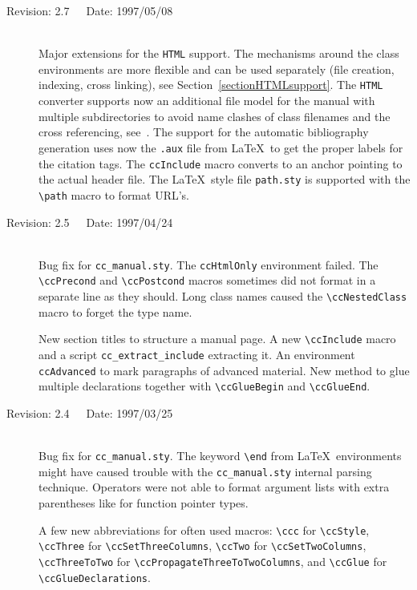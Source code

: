 \documentclass[11pt]{article}
\begin{document}
\begin{description}
    \item[Revision: 2.7~~~Date: 1997/05/08]~\\[3mm]
    Major extensions for the {\tt HTML} support. The mechanisms around the
    class environments are more flexible and can be used separately (file
    creation, indexing, cross linking), see
    Section~\ref{sectionHTMLsupport}. The {\tt HTML} converter supports
    now an additional file model for the manual with multiple
    subdirectories to avoid name clashes of class filenames and the cross
    referencing, see~\cite{k-lhcll-99}. The support for
    the automatic bibliography generation uses now the {\tt *.aux} file
    from \LaTeX\ to get the proper labels for the citation tags. The
    \verb+ccInclude+ macro converts to an anchor pointing to the actual
    header file. The \LaTeX\ style file {\tt path.sty} is supported
    with the \verb+\path+ macro to format URL's.


    \item[Revision: 2.5~~~Date: 1997/04/24]~\\[3mm]
    Bug fix for {\tt cc\_manual.sty}. The \verb+ccHtmlOnly+ environment
    failed. The \verb+\ccPrecond+ and \verb+\ccPostcond+ macros
    sometimes did not format in a separate line as they should. Long class
    names caused the \verb+\ccNestedClass+ macro to forget the type name.

    New section titles to structure a manual page. A new \verb+\ccInclude+
    macro and a script \verb+cc_extract_include+ extracting it. An
    environment \verb+ccAdvanced+ to mark paragraphs of advanced material.
    New method to glue multiple declarations together with
    \verb+\ccGlueBegin+ and \verb+\ccGlueEnd+.


    \item[Revision: 2.4~~~Date: 1997/03/25]~\\[3mm]
    Bug fix for {\tt cc\_manual.sty}. The keyword \verb+\end+ from \LaTeX\
    environments might have caused trouble with the {\tt cc\_manual.sty}
    internal parsing technique. Operators were not able to format argument
    lists with extra parentheses like for function pointer types.

    A few new abbreviations for often used macros: \verb+\ccc+
    for \verb+\ccStyle+, \verb+\ccThree+ for \verb+\ccSetThreeColumns+,
    \verb+\ccTwo+ for \verb+\ccSetTwoColumns+, \verb+\ccThreeToTwo+ for
    \verb+\ccPropagateThreeToTwoColumns+, and \verb+\ccGlue+ for
    \verb+\ccGlueDeclarations+.



\end{description}
\end{document}
